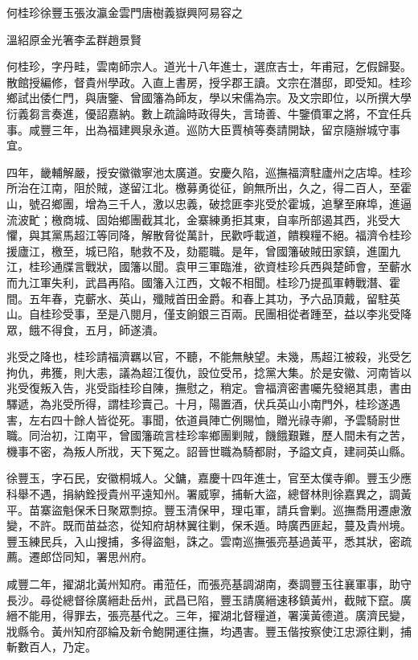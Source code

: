 
\begin{pinyinscope}
何桂珍徐豐玉張汝瀛金雲門唐樹義嶽興阿易容之

溫紹原金光箸李孟群趙景賢

何桂珍，字丹畦，雲南師宗人。道光十八年進士，選庶吉士，年甫冠，乞假歸娶。散館授編修，督貴州學政。入直上書房，授孚郡王讀。文宗在潛邸，即受知。桂珍鄉試出倭仁門，與唐鑒、曾國籓為師友，學以宋儒為宗。及文宗即位，以所撰大學衍義芻言奏進，優詔嘉納。數上疏論時政得失，言琦善、牛鑒僨軍之將，不宜任兵事。咸豐三年，出為福建興泉永道。巡防大臣賈楨等奏請開缺，留京隨辦城守事宜。

四年，畿輔解嚴，授安徽徽寧池太廣道。安慶久陷，巡撫福濟駐廬州之店埠。桂珍所治在江南，阻於賊，遂留江北。檄募勇從征，餉無所出，久之，得二百人，至霍山，號召鄉團，增為三千人，激以忠義，破捻匪李兆受於霍城，追擊至麻埠，進逼流波甿；檄商城、固始鄉團截其北，金寨練勇拒其東，自率所部遏其西，兆受大懼，與其黨馬超江等同降，解散脅從萬計，民歡呼載道，饋糗糧不絕。福濟令桂珍援廬江，檄至，城已陷，馳救不及，劾罷職。是年，曾國籓破賊田家鎮，進圍九江，桂珍通牒言戰狀，國籓以聞。袁甲三軍臨淮，欲資桂珍兵西與楚師會，至蘄水而九江軍失利，武昌再陷。國籓入江西，文報不相聞。桂珍乃提孤軍轉戰潛、霍間。五年春，克蘄水、英山，殲賊首田金爵。和春上其功，予六品頂戴，留駐英山。自桂珍受事，至是八閱月，僅支餉銀三百兩。民團相從者踵至，益以李兆受降眾，餓不得食，五月，師遂潰。

兆受之降也，桂珍請福濟羈以官，不聽，不能無觖望。未幾，馬超江被殺，兆受乞拘仇，弗獲，則大恚，議為超江復仇，設位受吊，捻黨大集。於是安徽、河南皆以兆受復叛入告，兆受詣桂珍自陳，撫慰之，稍定。會福濟密書囑先發絕其患，書由驛遞，為兆受所得，謂桂珍賣己。十月，陽置酒，伏兵英山小南門外，桂珍遂遇害，左右四十餘人皆從死。事聞，依道員陣亡例賜恤，贈光祿寺卿，予雲騎尉世職。同治初，江南平，曾國籓疏言桂珍率鄉團剿賊，饑餓艱難，歷人間未有之苦，機事不密，為叛人所戕，天下冤之。詔晉世職為騎都尉，予謚文貞，建祠英山縣。

徐豐玉，字石民，安徽桐城人。父鏞，嘉慶十四年進士，官至太僕寺卿。豐玉少應科舉不遇，捐納銓授貴州平遠知州。署威寧，捕斬大盜，總督林則徐嘉異之，調黃平。苗寨盜魁保禾日聚眾剽掠。豐玉清保甲，理屯軍，請兵會剿。巡撫喬用遷慮激變，不許。既而苗益恣，從知府胡林翼往剿，保禾遁。時廣西匪起，蔓及貴州境。豐玉練民兵，入山搜捕，多得盜魁，誅之。雲南巡撫張亮基過黃平，悉其狀，密疏薦。遷郎岱同知，署思州府。

咸豐二年，擢湖北黃州知府。甫蒞任，而張亮基調湖南，奏調豐玉往襄軍事，助守長沙。尋從總督徐廣縉赴岳州，武昌已陷，豐玉請廣縉速移鎮黃州，截賊下竄。廣縉不能用，得罪去，張亮基代之。三年，擢湖北督糧道，署漢黃德道。廣濟民變，戕縣令。黃州知府邵綸及新令鮑開運往撫，均遇害。豐玉偕按察使江忠源往剿，捕斬數百人，乃定。


\end{pinyinscope}
